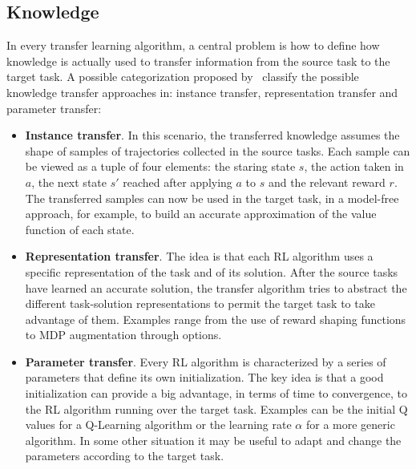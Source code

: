     \subsection{Knowledge}
      \noindent In every transfer learning algorithm, a central problem is how to define how knowledge is
      actually used to transfer information from the source task to the target task. A possible
      categorization proposed by~\cite{lazaric2012transfer} classify the possible knowledge transfer
      approaches in: instance transfer, representation transfer and parameter transfer:
      \begin{itemize}
        \item \textbf{Instance transfer}. In this scenario, the transferred knowledge assumes the shape of
        samples of trajectories collected in the source tasks. Each sample can be viewed as a tuple
        of four elements: the staring state $s$, the action taken in $a$, the next state $s'$ reached
        after applying $a$ to $s$ and the relevant reward $r$. The transferred samples can now be used
        in the target task, in a model-free approach, for example, to build an accurate approximation
        of the value function of each state.

        \item \textbf{Representation transfer}. The idea is that each RL algorithm uses a specific
        representation of the task and of its solution. After the source tasks have learned an accurate
        solution, the transfer algorithm tries to abstract the different task-solution representations
        to permit the target task to take advantage of them. Examples range from the use of reward
        shaping functions to MDP augmentation through options.

        \item \textbf{Parameter transfer}. Every RL algorithm is characterized by a series of parameters
        that define its own initialization. The key idea is that a good initialization can provide
        a big advantage, in terms of time to convergence, to the RL algorithm running over the target task.
        Examples can be the initial Q values for a Q-Learning algorithm or the learning rate $\alpha$ for a
        more generic algorithm. In some other situation it may be useful to adapt and change the parameters
        according to the target task.
      \end{itemize}

